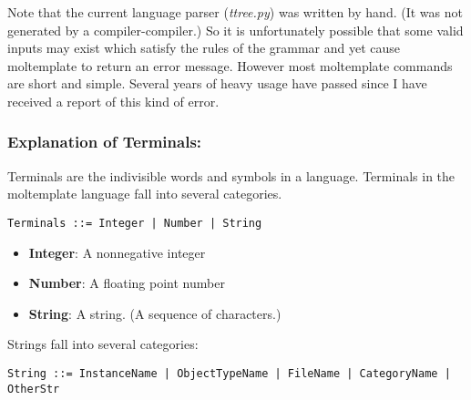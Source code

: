 \documentclass[11pt]{article}
\begin{document}
Note that the current language parser (\textit{ttree.py}) was written by hand.  (It was not generated by a compiler-compiler.)  So it is unfortunately possible that some valid inputs may exist which satisfy the rules of the grammar and yet cause moltemplate to return an error message.  However most moltemplate commands are short and simple.  Several years of heavy usage have passed since I have received a report of this kind of error.

\subsubsection*{Explanation of Terminals:}

Terminals are the indivisible words and symbols in a language.
Terminals in the moltemplate language fall into several categories.

\begin{verbatim}
Terminals ::= Integer | Number | String
\end{verbatim}

\begin{itemize}
\item \textbf{Integer}: A nonnegative integer

\item \textbf{Number}: A floating point number

\item \textbf{String}: A string. (A sequence of characters.)
\end{itemize}

Strings fall into several categories:

\begin{verbatim}
String ::= InstanceName | ObjectTypeName | FileName | CategoryName | OtherStr
\end{verbatim}
\end{document}
